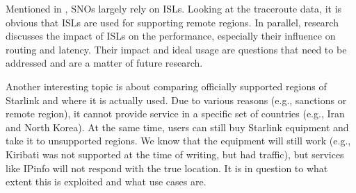 Mentioned in , \ac{SNO}s largely rely on \ac{ISL}s.
Looking at the traceroute data, it is obvious that \ac{ISL}s are used for
supporting remote regions. In parallel, research discusses the impact of
\ac{ISL}s on the performance, especially their influence on routing and
latency. Their impact and ideal usage are questions that need to be addressed
and are a matter of future research.

Another interesting topic is about comparing officially supported regions of
Starlink and where it is actually used. Due to various reasons (e.g., sanctions
or remote region), it cannot provide service in a specific set of countries
(e.g., Iran and North Korea). At the same time, users can still buy Starlink
equipment and take it to unsupported regions. We know that the equipment will
still work (e.g., Kiribati was not supported at the time of writing, but had
traffic), but services like IPinfo will not respond with the true location. It
is in question to what extent this is exploited and what use cases are.

